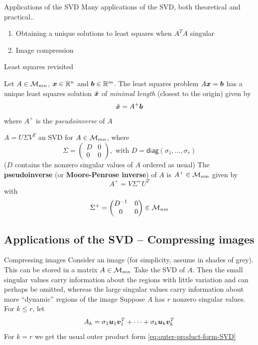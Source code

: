 \documentclass[aspectratio=169]{beamer}\usepackage[]{graphicx}\usepackage[]{xcolor}
\begin{document}
\begin{frame}{Applications of the SVD}
Many applications of the SVD, both theoretical and practical..
\vfill
\begin{enumerate}
\item Obtaining a unique solutions to least squares when $A^TA$ singular
\item Image compression
\end{enumerate}
\end{frame}


\begin{frame}{Least squares revisited}
\begin{theorem}
Let $A\in\mathcal{M}_{mn}$, $\bm{x}\in\mathbb{R}^n$ and $\bm{b}\in\mathbb{R}^m$. The least squares problem $A\bm{x}=\bm{b}$ has a unique least squares solution $\tilde{\bm{x}}$ of \emph{minimal length} (closest to the origin) given by
\[
\tilde{\bm{x}} = A^+\bm{b}
\]
where $A^+$ is the \emph{pseudoinverse} of $A$
\end{theorem}
\end{frame}

\begin{frame}
\begin{definition}[Pseudoinverse]
$A=U\Sigma V^T$ an SVD for $A\in\mathcal{M}_{mn}$, where 
\[
\Sigma = \begin{pmatrix}
D & 0 \\ 0 & 0
\end{pmatrix},
\textrm{ with }
D=\mathsf{diag}(\sigma_1,\ldots,\sigma_r)
\]
($D$ contains the nonzero singular values of $A$ ordered as usual)
\vskip0.5cm
The \textbf{pseudoinverse} (or \textbf{Moore-Penrose inverse}) of $A$ is $A^+\in\mathcal{M}_{nm}$ given by
\[
A^+ = V\Sigma^+ U^T
\]
with
\[
\Sigma^+ =
\begin{pmatrix}
D^{-1} & 0 \\ 0 & 0
\end{pmatrix}\in\mathcal{M}_{nm}
\]
\end{definition}
\end{frame}


\subsection{Applications of the SVD -- Compressing images}


\begin{frame}{Compressing images}
Consider an image (for simplicity, assume in shades of grey). This can be stored in a matrix $A\in\mathcal{M}_{mn}$
\vfill
Take the SVD of $A$. Then the small singular values carry information about the regions with little variation and can perhaps be omitted, whereas the large singular values carry information about more ``dynamic'' regions of the image
\vfill
Suppose $A$  has $r$ nonzero singular values. For $k\leq r$, let
\[
A_k = \sigma_1\bm{u}_1\bm{v}_1^T+\cdots+\sigma_k\bm{u}_k\bm{v}_k^T
\]
\vfill
For $k=r$ we get the usual outer product form \eqref{eq:outer-product-form-SVD}
\end{frame}
\end{document}
